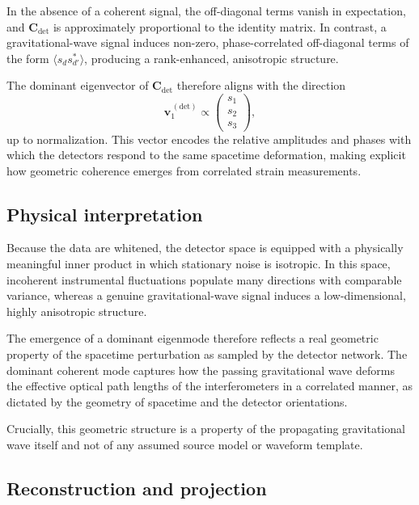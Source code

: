 \documentclass[11pt,a4paper]{article}
\begin{document}
In the absence of a coherent signal, the off-diagonal terms vanish in expectation, and $\mathbf{C}_{\mathrm{det}}$ is approximately proportional to the identity matrix.
In contrast, a gravitational-wave signal induces non-zero, phase-correlated off-diagonal terms of the form $\langle s_d s_{d'}^* \rangle$, producing a rank-enhanced, anisotropic structure.

The dominant eigenvector of $\mathbf{C}_{\mathrm{det}}$ therefore aligns with the direction
\begin{equation}
\mathbf{v}^{\,(\mathrm{det})}_1 \propto
\begin{pmatrix}
s_1 \\
s_2 \\
s_3
\end{pmatrix},
\end{equation}
up to normalization.
This vector encodes the relative amplitudes and phases with which the detectors respond to the same spacetime deformation, making explicit how geometric coherence emerges from correlated strain measurements.

\subsection{Physical interpretation}

Because the data are whitened, the detector space is equipped with a physically meaningful inner product in which stationary noise is isotropic.
In this space, incoherent instrumental fluctuations populate many directions with comparable variance, whereas a genuine gravitational-wave signal induces a low-dimensional, highly anisotropic structure.

The emergence of a dominant eigenmode therefore reflects a real geometric property of the spacetime perturbation as sampled by the detector network.
The dominant coherent mode captures how the passing gravitational wave deforms the effective optical path lengths of the interferometers in a correlated manner, as dictated by the geometry of spacetime and the detector orientations.

Crucially, this geometric structure is a property of the propagating gravitational wave itself and not of any assumed source model or waveform template.

\subsection{Reconstruction and projection}
\end{document}
